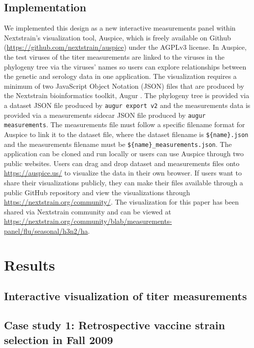 \documentclass[utf8]{FrontiersinHarvard} %
\begin{document}
\subsection{Implementation}

We implemented this design as a new interactive measurements panel within Nextstrain's visualization tool, Auspice, which is freely available on Github (\url{https://github.com/nextstrain/auspice}) under the AGPLv3 license.
In Auspice, the test viruses of the titer measurements are linked to the viruses in the phylogeny tree via the viruses' names so users can explore relationships between the genetic and serology data in one application.
The visualization requires a minimum of two JavaScript Object Notation (JSON) files that are produced by the Nextstrain bioinformatics toolkit, Augur \citep{Huddleston2021}.
The phylogeny tree is provided via a dataset JSON file produced by \texttt{augur export v2} and the measurements data is provided via a measurements sidecar JSON file produced by \texttt{augur measurements}.
The measurements file must follow a specific filename format for Auspice to link it to the dataset file, where the dataset filename is \texttt{\$\{name\}.json} and the measurements filename must be \texttt{\$\{name\}\_measurements.json}.
The application can be cloned and run locally or users can use Auspice through two public websites.
Users can drag and drop dataset and measurements files onto \url{https://auspice.us/} to visualize the data in their own browser.
If users want to share their visualizations publicly, they can make their files available through a public GitHub repository and view the visualizations through \url{https://nextstrain.org/community/}.
The visualization for this paper has been shared via Nextstrain community and can be viewed at \url{https://nextstrain.org/community/blab/measurements-panel/flu/seasonal/h3n2/ha}.

\section{Results}

\subsection{Interactive visualization of titer measurements}

\subsection{Case study 1: Retrospective vaccine strain selection in Fall 2009}
\end{document}
